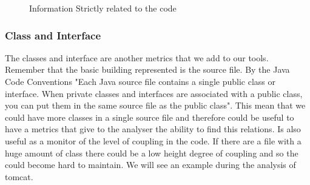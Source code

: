 \documentclass[]{usiinfbachelorproject}
\begin{document}
\begin{figure}[h]
\centering
{}
\hspace*{\fill}

\caption{Information Strictly related to the code}
\label{fig:strictly}
\end{figure}
\newpage

\subsubsection{Class and Interface}

The classes and  interface are another metrics that we add to our tools. Remember that the basic building represented is the source file.  By the Java Code Conventions \cite{oracle}  "Each Java source file contains a single public class or interface. When private classes and
interfaces are associated with a public class, you can put them in the same source file as the public class". This mean that we could have more classes in a single source file and therefore could be useful to have a metrics that give to the analyser the ability to find this relations.
Is also useful as a monitor of the level of coupling in the code. If there are a file with a huge amount of class there could be a low height degree of coupling and so the could become hard to maintain. We will see an example during the analysis of tomcat.
\end{document}
